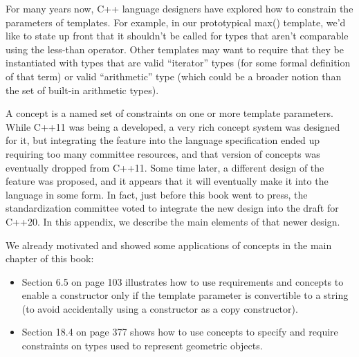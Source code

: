 For many years now, C++ language designers have explored how to constrain the parameters of templates. For example, in our prototypical max() template, we’d like to state up front that it shouldn’t be called for types that aren’t comparable using the less-than operator. Other templates may want to require that they be instantiated with types that are valid “iterator” types (for some formal definition of that term) or valid “arithmetic” type (which could be a broader notion than the set of built-in arithmetic types).

A concept is a named set of constraints on one or more template parameters. While C++11 was being a developed, a very rich concept system was designed for it, but integrating the feature into the language specification ended up requiring too many committee resources, and that version of concepts was eventually dropped from C++11. Some time later, a different design of the feature was proposed, and it appears that it will eventually make it into the language in some form. In fact, just before this book went to press, the standardization committee voted to integrate the new design into the draft for C++20. In this appendix, we describe the main elements of that newer design.

We already motivated and showed some applications of concepts in the main chapter of this book:

\begin{itemize}
\item 
Section 6.5 on page 103 illustrates how to use requirements and concepts to enable a constructor only if the template parameter is convertible to a string (to avoid accidentally using a constructor as a copy constructor).

\item 
Section 18.4 on page 377 shows how to use concepts to specify and require constraints on types used to represent geometric objects.
\end{itemize}